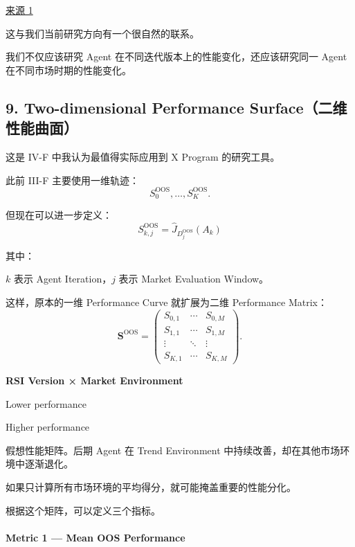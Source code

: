 \href{https://onlinelibrary.wiley.com/doi/full/10.1002/jae.1177}{来源 1}

这与我们当前研究方向有一个很自然的联系。

我们不仅应该研究 Agent 在不同迭代版本上的性能变化，还应该研究同一 Agent 在不同市场时期的性能变化。

\hypertarget{part-4-77-0001-two-dimensional-performance-surfaceux4e8cux7ef4ux6027ux80fdux66f2ux9762}{%
\subsection{9. Two-dimensional Performance Surface（二维性能曲面）}\label{part-4-77-0001-two-dimensional-performance-surfaceux4e8cux7ef4ux6027ux80fdux66f2ux9762}}

这是 IV-F 中我认为最值得实际应用到 X Program 的研究工具。

此前 III-F 主要使用一维轨迹：
\[S_0^{\mathrm{OOS}},\ldots,S_K^{\mathrm{OOS}}.\]

但现在可以进一步定义：
\[\boxed{
S_{k,j}^{\mathrm{OOS}}
=
\widehat J_{D_j^{\mathrm{OOS}}}(A_k)
}\]

其中：

\(k\) 表示 Agent Iteration，\(j\) 表示 Market Evaluation Window。

这样，原本的一维 Performance Curve 就扩展为二维 Performance Matrix：
\[\mathbf S^{\mathrm{OOS}}
=
\begin{pmatrix}
S_{0,1}&\cdots&S_{0,M}\\
S_{1,1}&\cdots&S_{1,M}\\
\vdots&\ddots&\vdots\\
S_{K,1}&\cdots&S_{K,M}
\end{pmatrix}.\]

\textbf{RSI Version × Market Environment}


Lower performance

Higher performance

假想性能矩阵。后期 Agent 在 Trend Environment 中持续改善，却在其他市场环境中逐渐退化。

如果只计算所有市场环境的平均得分，就可能掩盖重要的性能分化。

根据这个矩阵，可以定义三个指标。

\hypertarget{part-4-77-0001-metric-1-mean-oos-performance}{%
\paragraph{Metric 1 --- Mean OOS Performance}\label{part-4-77-0001-metric-1-mean-oos-performance}}

